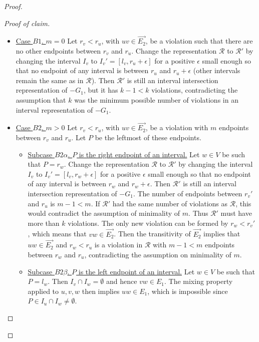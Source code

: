 \begin{proof}
\begin{proof}[Proof of claim]
		\begin{itemize}[]
			\item \underline{Case $B1$. $m = 0$} Let $r_v < r_u$, with $uv \in \overrightarrow{E_2}$, be a violation such that there are no other endpoints between $r_v$ and $r_u$. Change the representation $\mathcal{R}$ to $\mathcal{R}'$ by changing the interval $I_v$ to $I_v' = [l_v , r_u + \epsilon]$ for a positive $\epsilon$ small enough so that no endpoint of any interval is between $r_u$ and $r_u + \epsilon$ (other intervals remain the same as in $\mathcal{R}$). Then $\mathcal{R}'$ is still an interval intersection representation of $-G_1$, but it has $k - 1 < k$ violations, contradicting the assumption that $k$ was the minimum possible number of violations in an interval representation of $-G_1$.
			
			\item \underline{Case $B2$. $m > 0$} Let $r_v < r_u$, with $uv \in \overrightarrow{E_2}$, be a violation with $m$ endpoints between $r_v$ and $r_u$. Let $P$ be the leftmost of these endpoints.
			
			\begin{itemize}[]
				\item \underline{Subcase $B2\alpha$. $P$ is the right endpoint of an interval.} Let $w \in V$ be such that $P = r_w$. Change the representation $\mathcal{R}$ to $\mathcal{R}'$ by changing the interval $I_v$ to $I_v' = [l_v , r_w + \epsilon]$ for a positive $\epsilon$ small enough so that no endpoint of any interval is between $r_w$ and $r_w + \epsilon$. Then $\mathcal{R}'$ is still an interval intersection representation of $-G_1$. The number of endpoints between $r_v'$ and $r_u$ is $m - 1 < m$. If $\mathcal{R}'$ had the same number of violations as $\mathcal{R}$, this would contradict the assumption of minimality of $m$. Thus $\mathcal{R}'$ must have more than $k$ violations. The only new violation can be formed by $r_w < r_v'$, which means that $vw \in \overrightarrow{E_2}$. Then the transitivity of $\overrightarrow{E_2}$ implies that $uw \in \overrightarrow{E_2}$ and $r_w < r_u$ is a violation in $\mathcal{R}$ with $m - 1 < m$ endpoints between $r_w$ and $r_u$, contradicting the assumption on minimality of $m$.
				
				\item \underline{Subcase $B2\beta$. $P$ is the left endpoint of an interval.} Let $w \in V$ be such that $P = l_w$. Then $I_v \cap I_w = \emptyset$ and hence $vw \in E_1$. The mixing property applied to $u, v, w$ then implies $uw \in E_1$, which is impossible since $P \in I_u \cap I_w \neq \emptyset$.
			\end{itemize}
		\end{itemize}
		

\end{proof}
\end{proof}
